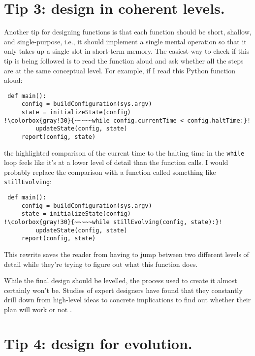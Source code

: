 \documentclass[10pt,letterpaper]{article}
\begin{document}
\section*{Tip 3: design in coherent levels.}

Another tip for designing functions is that
each function should be short, shallow, and single-purpose,
i.e.,
it should implement a single mental operation
so that it only takes up a single slot in short-term memory.
The easiest way to check if this tip is being followed
is to read the function aloud
and ask whether all the steps are at the same conceptual level.
For example,
if I read this Python function aloud:

\begin{lstlisting}
 def main():
     config = buildConfiguration(sys.argv)
     state = initializeState(config)
!\colorbox{gray!30}{~~~~~while config.currentTime < config.haltTime:}!
         updateState(config, state)
     report(config, state)
\end{lstlisting}

\noindent
the highlighted comparison of the current time to the halting time in the \texttt{while} loop
feels like it's at a lower level of detail than the function calls.
I would probably replace the comparison with a function called something like \texttt{stillEvolving}:

\begin{lstlisting}
 def main():
     config = buildConfiguration(sys.argv)
     state = initializeState(config)
!\colorbox{gray!30}{~~~~~while stillEvolving(config, state):}!
         updateState(config, state)
     report(config, state)
\end{lstlisting}

\noindent
This rewrite saves the reader
from having to jump between two different levels of detail
while they're trying to figure out what this function does.

\begin{mdframed}
  \noindent
  While the final design should be levelled,
  the process used to create it almost certainly won't be.
  Studies of expert designers have found that
  they constantly drill down from high-level ideas to concrete implications
  to find out whether their plan will work or not \cite{Schon1984}.
\end{mdframed}

\section*{Tip 4: design for evolution.}
\end{document}
